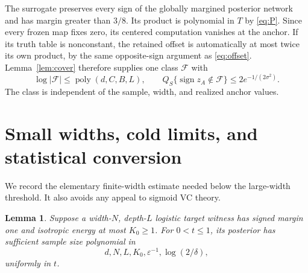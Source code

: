 \documentclass[11pt]{article}
\newtheorem{lemma}[theorem]{Lemma}
\theoremstyle{remark}\newtheorem{remark}[theorem]{Remark}
\newcommand{\poly}{\operatorname{poly}}
\begin{document}
The surrogate preserves every sign of the globally margined posterior
network and has margin greater than $3/8$. Its product is polynomial in
$T$ by \eqref{eq:P}. Since every frozen map fixes zero, its centered
computation vanishes at the anchor. If its truth table is nonconstant,
the retained offset is automatically at most twice its own product,
by the same opposite-sign argument as \eqref{eq:offset}. Lemma~\ref{lem:cover}
therefore supplies one class $\mathcal F$ with
\begin{equation}\label{eq:commonclass}
 \log|\mathcal F|\le\poly(d,C,B,L),\qquad
 Q_S\{\operatorname{sign}z_A\notin\mathcal F\}
 \le2e^{-1/(2\sigma^2)}.
\end{equation}
The class is independent of the sample, width, and realized anchor values.

\section{Small widths, cold limits, and statistical conversion}

We record the elementary finite-width estimate needed below the
large-width threshold. It also avoids any appeal to sigmoid VC theory.

\begin{lemma}\label{lem:finitewidth}
Suppose a width-$N$, depth-$L$ logistic target witness has signed margin
one and isotropic energy at most $K_0\ge1$. For $0<t\le1$, its posterior
has sufficient sample size polynomial in
\[
 d,N,L,K_0,\varepsilon^{-1},\log(2/\delta),
\]
uniformly in $t$.
\end{lemma}
\end{document}
